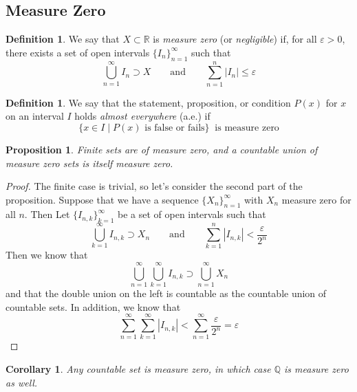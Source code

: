 \documentclass[12pt]{article}
\theoremstyle{plain}
\newtheorem{prop}[thm]{Proposition}
\newtheorem{cor}[thm]{Corollary}
\theoremstyle{definition}
\newtheorem{defn}[thm]{Definition}
\theoremstyle{remark}
\begin{document}
\subsection{Measure Zero}

\begin{defn}
We say that $X\subset\mathbb{R}$ is \emph{measure zero} (or \emph{negligible}) if, for all $\varepsilon>0$, there exists a set of open intervals $\{I_n\}_{n=1}^\infty$ such that 
\[ 
    \bigcup^\infty_{n=1} I_n \supset X \qquad
    \text{and} \qquad \sum^n_{n=1} |I_n|\leq \varepsilon
\]
\end{defn}

\begin{defn} 
We say that the statement, proposition, or condition $P(x)$ for $x$ on an interval $I$ holds \emph{almost everywhere} (a.e.) if 
\[
    \{ x \in I \; | \; P(x) \text{ is false or fails} \} 
    \;\; \text{is measure zero}
\]
\end{defn}

\begin{prop}
\label{countunion}
Finite sets are of measure zero, and a countable union of measure zero sets is itself measure zero.
\end{prop}
\begin{proof}
The finite case is trivial, so let's consider the second part of the proposition. Suppose that we have a sequence $\{X_n\}_{n=1}^\infty$ with $X_n$ measure zero for all $n$. Then Let $\{I_{n,k}\}_{k=1}^\infty$ be a set of open intervals such that 
    \[
        \bigcup^\infty_{k=1} I_{n,k} \supset X_n 
        \qquad \text{and} \qquad
        \sum^n_{k=1} |I_{n,k}| < \frac{\varepsilon}{2^n}  
    \]
Then we know that 
    \[
        \bigcup^\infty_{n=1}\bigcup^\infty_{k=1} 
        I_{n,k} \supset \bigcup^\infty_{n=1}  X_n 
    \]
and that the double union on the left is countable as the countable union of countable sets. In addition, we know that 
    \[
        \sum^\infty_{n=1}\sum^\infty_{k=1} 
        |I_{n,k}| < \sum^\infty_{n=1} \frac{\varepsilon}{2^n} 
        = \varepsilon
    \]
\end{proof}
\begin{cor}
Any countable set is measure zero, in which case $\mathbb{Q}$ is measure zero as well.
\end{cor}
\end{document}

